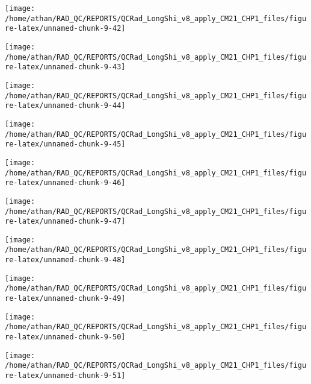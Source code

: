 \documentclass[
  10pt,
  a4paper,oneside]{article}
\begin{document}
\begin{center}\texttt{[image: /home/athan/RAD\_QC/REPORTS/QCRad\_LongShi\_v8\_apply\_CM21\_CHP1\_files/figure-latex/unnamed-chunk-9-42]} \end{center}

\begin{center}\texttt{[image: /home/athan/RAD\_QC/REPORTS/QCRad\_LongShi\_v8\_apply\_CM21\_CHP1\_files/figure-latex/unnamed-chunk-9-43]} \end{center}

\begin{center}\texttt{[image: /home/athan/RAD\_QC/REPORTS/QCRad\_LongShi\_v8\_apply\_CM21\_CHP1\_files/figure-latex/unnamed-chunk-9-44]} \end{center}

\begin{center}\texttt{[image: /home/athan/RAD\_QC/REPORTS/QCRad\_LongShi\_v8\_apply\_CM21\_CHP1\_files/figure-latex/unnamed-chunk-9-45]} \end{center}

\begin{center}\texttt{[image: /home/athan/RAD\_QC/REPORTS/QCRad\_LongShi\_v8\_apply\_CM21\_CHP1\_files/figure-latex/unnamed-chunk-9-46]} \end{center}

\begin{center}\texttt{[image: /home/athan/RAD\_QC/REPORTS/QCRad\_LongShi\_v8\_apply\_CM21\_CHP1\_files/figure-latex/unnamed-chunk-9-47]} \end{center}

\begin{center}\texttt{[image: /home/athan/RAD\_QC/REPORTS/QCRad\_LongShi\_v8\_apply\_CM21\_CHP1\_files/figure-latex/unnamed-chunk-9-48]} \end{center}

\begin{center}\texttt{[image: /home/athan/RAD\_QC/REPORTS/QCRad\_LongShi\_v8\_apply\_CM21\_CHP1\_files/figure-latex/unnamed-chunk-9-49]} \end{center}

\begin{center}\texttt{[image: /home/athan/RAD\_QC/REPORTS/QCRad\_LongShi\_v8\_apply\_CM21\_CHP1\_files/figure-latex/unnamed-chunk-9-50]} \end{center}

\begin{center}\texttt{[image: /home/athan/RAD\_QC/REPORTS/QCRad\_LongShi\_v8\_apply\_CM21\_CHP1\_files/figure-latex/unnamed-chunk-9-51]} \end{center}
\end{document}
